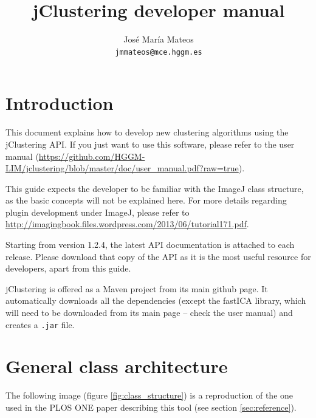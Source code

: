 \documentclass[11pt]{article} %
\title{jClustering developer manual}
\author{José María Mateos \\ \texttt{jmmateos@mce.hggm.es}}
\begin{document}
\lstset{language=Java, stringstyle=\ttfamily, basicstyle=\ttfamily\small, frame=single}

\maketitle

\tableofcontents

\section{Introduction}

This document explains how to develop new clustering algorithms using the jClustering API. If you just want to use this software, please refer to the user manual (\url{https://github.com/HGGM-LIM/jclustering/blob/master/doc/user_manual.pdf?raw=true}).

This guide expects the developer to be familiar with the ImageJ class structure, as the basic concepts will not be explained here.
For more details regarding plugin development under ImageJ, please refer to \url{http://imagingbook.files.wordpress.com/2013/06/tutorial171.pdf}.

Starting from version 1.2.4, the latest API documentation is attached to each release. Please download that copy of the API as it is the most useful resource for developers, apart from this guide.

jClustering is offered as a Maven project from its main github page. It automatically downloads all the dependencies (except the fastICA library, which will need to be downloaded from its main page -- check the user manual) and creates a {\tt .jar} file.

\section{General class architecture}

The following image (figure \ref{fig:class_structure}) is a reproduction of the one used in the PLOS ONE paper describing this tool (see section \ref{sec:reference}).
\end{document}
